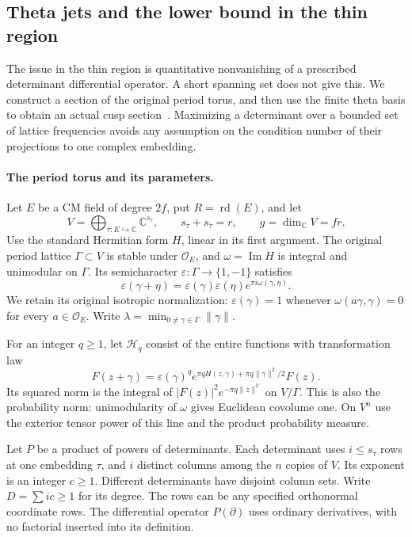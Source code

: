\subsection{Theta jets and the lower bound in the thin region}
\label{shared-actual-thin-bergman}

The issue in the thin region is quantitative nonvanishing of a
prescribed determinant differential operator.  A short spanning set
does not give this.  We construct a section of the original period
torus, and then use the finite theta basis to obtain an actual cusp
section~\cite{bergman-thin-source}.  Maximizing a determinant over a bounded set of lattice
frequencies avoids any assumption on the condition number of their
projections to one complex embedding.

\paragraph{The period torus and its parameters.}
Let $E$ be a CM field of degree $2f$, put $R=\operatorname{rd}(E)$,
and let
\[
 V=\bigoplus_{\tau:E\hookrightarrow\mathbb C}\mathbb C^{s_\tau},
 \qquad s_\tau+s_{\bar\tau}=r,\qquad g=\dim_{\mathbb C}V=fr.
\]
Use the standard Hermitian form $H$, linear in its first argument.
The original period lattice $\Gamma\subset V$ is stable under
$\mathcal O_E$, and $\omega=\operatorname{Im}H$ is integral and
unimodular on $\Gamma$.  Its semicharacter
$\varepsilon:\Gamma\to\{1,-1\}$ satisfies
\[
 \varepsilon(\gamma+\eta)
   =\varepsilon(\gamma)\varepsilon(\eta)e^{\pi i\omega(\gamma,\eta)}.
\]
We retain its original isotropic normalization:
$\varepsilon(\gamma)=1$ whenever
$\omega(a\gamma,\gamma)=0$ for every $a\in\mathcal O_E$.
Write $\lambda=\min_{0\ne\gamma\in\Gamma}\|\gamma\|$.

For an integer $q\ge1$, let $\mathcal H_q$ consist of the entire
functions with transformation law
\[
 F(z+\gamma)=\varepsilon(\gamma)^q
  e^{\pi q H(z,\gamma)+\pi q\|\gamma\|^2/2}F(z).
\]
Its squared norm is the integral of
$|F(z)|^2e^{-\pi q\|z\|^2}$ on $V/\Gamma$.
This is also the probability norm: unimodularity of $\omega$
gives Euclidean covolume one.  On $V^n$ use the exterior tensor
power of this line and the product probability measure.

Let $P$ be a product of powers of determinants.  Each determinant
uses $i\le s_\tau$ rows at one embedding $\tau$, and $i$
distinct columns among the $n$ copies of $V$.  Its exponent is an
integer $c\ge1$.  Different determinants have disjoint column
sets.  Write $D=\sum ic\ge1$ for its degree.  The rows can be any
specified orthonormal coordinate rows.  The differential operator
$P(\partial)$ uses ordinary derivatives, with no factorial
inserted into its definition.

